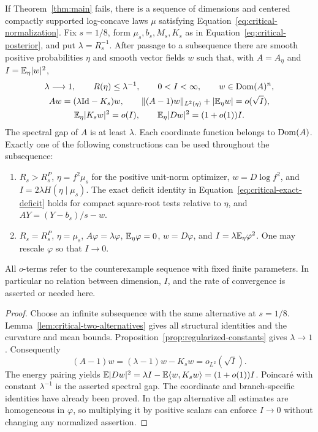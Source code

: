 \begin{proposition}\label{prop:critical-sequence}
If Theorem~\ref{thm:main} fails, there is a sequence of dimensions
and centered compactly supported log-concave laws $\mu$ satisfying
Equation~\eqref{eq:critical-normalization}. Fix $s=1/8$, form
$\mu_s,b_s,M_s,K_s$ as in Equation~\eqref{eq:critical-posterior},
and put $\lambda=R_s^{-1}$. After passage to a subsequence there
are smooth positive probabilities $\eta$ and smooth vector fields
$w$ such that, with $A=A_\eta$ and $I=\mathbb E_\eta|w|^2$,
\begin{gather}
 \lambda\longrightarrow1,\qquad R(\eta)\le\lambda^{-1},
 \qquad 0<I<\infty,\qquad w\in\operatorname{Dom}(A)^n,
 \label{eq:critical-sequence-data}\\
 A w=(\lambda\mathrm{Id}-K_s)w,\qquad
 \|(A-1)w\|_{L^2(\eta)}+|\mathbb E_\eta w|=o(\sqrt I),
 \label{eq:critical-near-eigenfunction}\\
 \mathbb E_\eta|K_sw|^2=o(I),\qquad
 \mathbb E_\eta|Dw|^2=(1+o(1))I.
 \label{eq:critical-sequence-energy}
\end{gather}
The spectral gap of $A$ is at least $\lambda$. Each coordinate
function belongs to $\operatorname{Dom}(A)$. Exactly one of the following
constructions can be used throughout the subsequence:
\begin{enumerate}[label=\textup{(\roman*)}]
\item $R_s>R_s^P$, $\eta=f^2\mu_s$ for the positive unit-norm
optimizer, $w=D\log f^2$, and
$I=2\lambda H(\eta\mid\mu_s)$. The exact deficit identity in
Equation~\eqref{eq:critical-exact-deficit} holds for compact square-root
tests relative to $\eta$, and
$A Y=(Y-b_s)/s-w$.
\item $R_s=R_s^P$, $\eta=\mu_s$,
$A\varphi=\lambda\varphi$, $\mathbb E_\eta\varphi=0$,
$w=D\varphi$, and $I=\lambda\mathbb E_\eta\varphi^2$.
One may rescale $\varphi$ so that $I\to0$.
\end{enumerate}
All $o$-terms refer to the counterexample sequence with fixed
finite parameters. In particular no relation between dimension,
$I$, and the rate of convergence is asserted or needed here.
\end{proposition}

\begin{proof}
Choose an infinite subsequence with the same alternative at
$s=1/8$. Lemma~\ref{lem:critical-two-alternatives} gives all
structural identities and the curvature and mean bounds.
Proposition~\ref{prop:regularized-constants} gives $\lambda\to1$.
Consequently
\[
 (A-1)w=(\lambda-1)w-K_sw=o_{L^2}(\sqrt I).
\]
The energy pairing yields
$\mathbb E|Dw|^2=\lambda I-\mathbb E\langle w,K_sw\rangle=(1+o(1))I$.
Poincar\'e with constant $\lambda^{-1}$ is the asserted spectral
gap. The coordinate and branch-specific identities have already
been proved. In the gap alternative all estimates are homogeneous
in $\varphi$, so multiplying it by positive scalars can enforce
$I\to0$ without changing any normalized assertion.
\end{proof}
